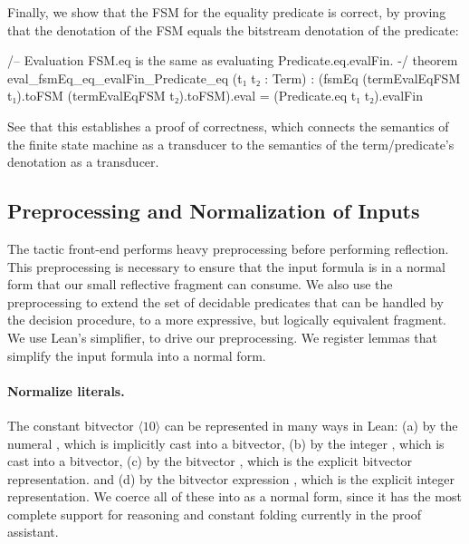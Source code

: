Finally, we show that the FSM for the equality predicate is correct,
by proving that the denotation of the FSM equals the bitstream denotation of the predicate:

\begin{lean}
/-- Evaluation FSM.eq is the same as evaluating Predicate.eq.evalFin. -/
theorem eval_fsmEq_eq_evalFin_Predicate_eq (t₁ t₂ : Term) :
   (fsmEq (termEvalEqFSM t₁).toFSM (termEvalEqFSM t₂).toFSM).eval =
   (Predicate.eq t₁ t₂).evalFin
\end{lean}

See that this establishes a proof of correctness,
which connects the semantics of the finite state machine as a transducer
to the semantics of the term/predicate's denotation as a transducer.

\subsection{Preprocessing and Normalization of Inputs}
\label{sec:swbv:preprocessing}

The tactic front-end performs heavy preprocessing before performing reflection.
This preprocessing is necessary to ensure that the input formula is in a normal form that our small reflective fragment can consume.
We also use the preprocessing to extend the set of decidable predicates that can be handled by the decision procedure,
to a more expressive, but logically equivalent fragment.
We use Lean's simplifier,  to drive our preprocessing.
We register lemmas that simplify the input formula into a normal form.

\paragraph{Normalize literals.}
The constant bitvector $\langle10\rangle$ can be represented in many ways in Lean:
(a) by the numeral , which is implicitly cast into a bitvector,
(b) by the integer , which is cast into a bitvector,
(c) by the bitvector , which is the explicit bitvector representation.
and (d) by the bitvector expression , which is the explicit integer representation.
We coerce all of these into  as a normal form,
since it has the most complete support for reasoning and constant folding currently in the proof assistant.

